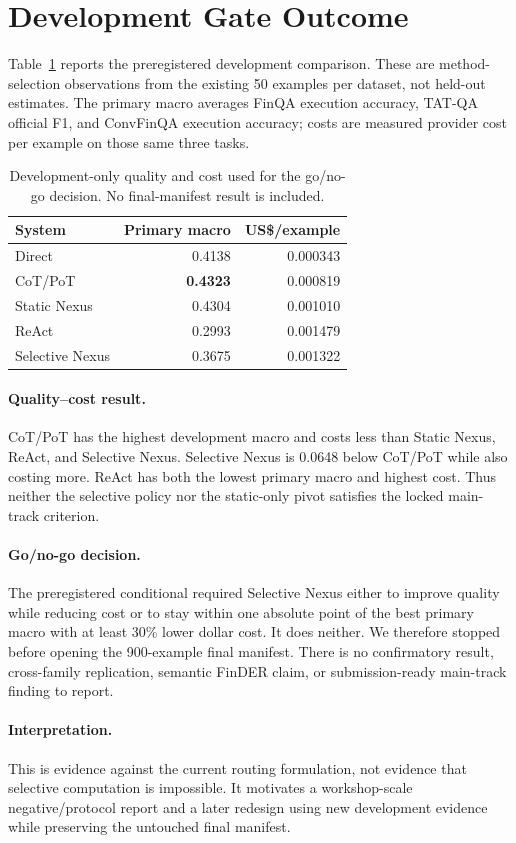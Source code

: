 \section{Development Gate Outcome}
\label{sec:results}

Table~\ref{tab:development-gate} reports the preregistered development comparison. These are method-selection observations from the existing 50 examples per dataset, not held-out estimates. The primary macro averages FinQA execution accuracy, TAT-QA official F1, and ConvFinQA execution accuracy; costs are measured provider cost per example on those same three tasks.

\begin{table}[t]
  \caption{Development-only quality and cost used for the go/no-go decision. No final-manifest result is included.}
  \label{tab:development-gate}
  \centering
  \small
  \setlength{\tabcolsep}{5pt}
  \begin{tabular}{lrr}
    \toprule
    System & Primary macro & US\$/example \\
    \midrule
    Direct & 0.4138 & 0.000343 \\
    CoT/PoT & \textbf{0.4323} & 0.000819 \\
    Static Nexus & 0.4304 & 0.001010 \\
    ReAct & 0.2993 & 0.001479 \\
    Selective Nexus & 0.3675 & 0.001322 \\
    \bottomrule
  \end{tabular}
\end{table}

\paragraph{Quality--cost result.}
CoT/PoT has the highest development macro and costs less than Static Nexus, ReAct, and Selective Nexus. Selective Nexus is 0.0648 below CoT/PoT while also costing more. ReAct has both the lowest primary macro and highest cost. Thus neither the selective policy nor the static-only pivot satisfies the locked main-track criterion.

\paragraph{Go/no-go decision.}
The preregistered conditional required Selective Nexus either to improve quality while reducing cost or to stay within one absolute point of the best primary macro with at least 30\% lower dollar cost. It does neither. We therefore stopped before opening the 900-example final manifest. There is no confirmatory result, cross-family replication, semantic FinDER claim, or submission-ready main-track finding to report.

\paragraph{Interpretation.}
This is evidence against the current routing formulation, not evidence that selective computation is impossible. It motivates a workshop-scale negative/protocol report and a later redesign using new development evidence while preserving the untouched final manifest.
